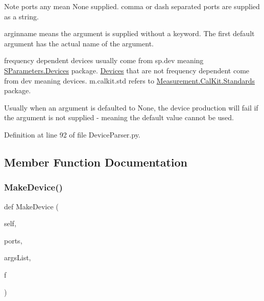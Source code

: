 \begin{DoxyNote}{Note}
ports any mean None supplied. comma or dash separated ports are supplied as a string. 

arginname means the argument is supplied without a keyword. The first default argument has the actual name of the argument. 

frequency dependent devices usually come from \textquotesingle{}sp.\+dev\textquotesingle{} meaning \hyperlink{namespaceSignalIntegrity_1_1SParameters_1_1Devices}{S\+Parameters.\+Devices} package. \hyperlink{namespaceSignalIntegrity_1_1Parsers_1_1Devices}{Devices} that are not frequency dependent come from \textquotesingle{}dev\textquotesingle{} meaning devices. \textquotesingle{}m.\+calkit.\+std\textquotesingle{} refers to \textquotesingle{}\hyperlink{namespaceSignalIntegrity_1_1Measurement_1_1CalKit_1_1Standards}{Measurement.\+Cal\+Kit.\+Standards}\textquotesingle{} package. 

Usually when an argument is defaulted to None, the device production will fail if the argument is not supplied -\/ meaning the default value cannot be used. 
\end{DoxyNote}


Definition at line 92 of file Device\+Parser.\+py.



\subsection{Member Function Documentation}
\mbox{\label{classSignalIntegrity_1_1Parsers_1_1Devices_1_1DeviceParser_1_1DeviceFactory_a84bd6828768b3a1677c71d39f3cb91dd}} 
\subsubsection{\texorpdfstring{Make\+Device()}{MakeDevice()}}
{\footnotesize\ttfamily def Make\+Device (\begin{DoxyParamCaption}\item[{}]{self,  }\item[{}]{ports,  }\item[{}]{args\+List,  }\item[{}]{f }\end{DoxyParamCaption})}



